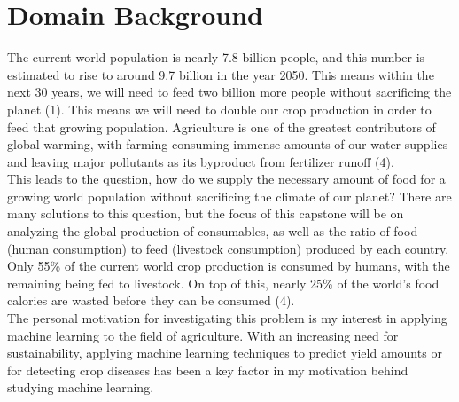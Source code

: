 \documentclass[12pt, a4paper]{article}
\begin{document}
\begin{spacing}{1.1}
	\begin{titlepage}
		\vspace*{4cm}
		\renewcommand*\contentsname{Table of Contents}
		\tableofcontents
	\end{titlepage} \newpage


	\section{Domain Background}
	The current world population is nearly 7.8 billion people, and this number is estimated to rise to around 9.7 billion in the year 2050. This means within the next 30 years, we will need to feed two billion more people without sacrificing the planet (1). This means we will need to double our crop production in order to feed that growing population. Agriculture is one of the greatest contributors of global warming, with farming consuming immense amounts of our water supplies and leaving major pollutants as its byproduct from fertilizer runoff (4).  \vspace*{2mm}\\
	This leads to the question, how do we supply the necessary amount of food for a growing world population without sacrificing the climate of our planet? There are many solutions to this question, but the focus of this capstone will be on analyzing the global production of consumables, as well as the ratio of food (human consumption) to feed (livestock consumption) produced by each country. Only 55\% of the current world crop production is consumed by humans, with the remaining being fed to livestock. On top of this, nearly 25\% of the world's food calories are wasted before they can be consumed (4). \vspace*{2mm}\\
	The personal motivation for investigating this problem is my interest in applying machine learning to the field of agriculture. With an increasing need for sustainability, applying machine learning techniques to predict yield amounts or for detecting crop diseases has been a key factor in my motivation behind studying machine learning.


\end{spacing}
\end{document}
